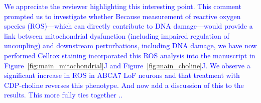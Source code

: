 \textcolor{blue}{We appreciate the reviewer highlighting this interesting point. This comment prompted us to investigate whether Because measurement of reactive oxygen species (ROS)—which can directly contribute to DNA damage—would provide a link between mitochondrial dysfunction (including impaired regulation of uncoupling) and downstream perturbations, including DNA damage, we have now performed Cellrox staining incorporated this ROS analysis into the manuscript in Figure~\ref{fig:main_mitochondrial}J and Figure~\ref{fig:main_choline}J. We observe a significant increase in ROS in ABCA7 LoF neurons and that treatment with CDP-choline reverses this phenotype. And now add a discussion of this to the results. This more fully ties together ..}
	
